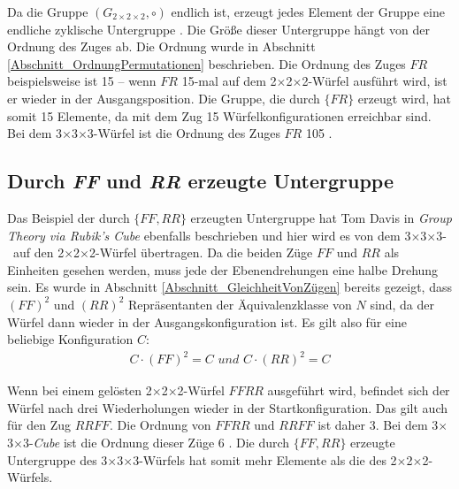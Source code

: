 \documentclass[12pt,a4paper, usenames, dvipsnames]{article}
\theoremstyle{mystyle}
\theoremstyle{definition}
\newcommand{\Gtwo}{\ensuremath{G_{2\times 2\times 2}}}
\newcommand{\Ttwo}{2$\times$2$\times$2-}
\newcommand{\Tthree}{3$\times$3$\times$3-}
\begin{document}
Da die Gruppe $(\Gtwo, \circ)$ endlich ist, erzeugt jedes Element der Gruppe eine endliche zyklische Untergruppe \cite{TD}. Die Größe dieser Untergruppe hängt von der Ordnung des Zuges ab. Die Ordnung wurde in Abschnitt \ref{Abschnitt_OrdnungPermutationen} beschrieben.
Die Ordnung des Zuges $FR$ beispielsweise ist 15 -- wenn $FR$ 15-mal auf dem \Ttwo Würfel ausführt wird, ist er wieder in der Ausgangsposition. 
Die Gruppe, die durch $\{FR\}$ erzeugt wird, hat somit 15 Elemente, da mit dem Zug 15 Würfelkonfigurationen erreichbar sind. Bei dem \Tthree Würfel ist die Ordnung des Zuges $FR$ 105 \cite{TD}.
%
%
%
%
%
%
%
%
%
%
%
%
%
%
%
%
%
%
%

\subsection{Durch \textit{FF} und \textit{RR} erzeugte Untergruppe}
\label{Abschnitt_UntergruppeFFRR}

Das Beispiel der durch $\{ FF, RR \}$ erzeugten Untergruppe hat Tom Davis in \textit{Group Theory via Rubik's Cube} \cite{TD} ebenfalls beschrieben und hier wird es von dem \Tthree \ auf den \Ttwo Würfel übertragen.
Da die beiden Züge $FF$ und $RR$ als Einheiten gesehen werden, muss jede der Ebenendrehungen eine halbe Drehung sein.
Es wurde in Abschnitt \ref{Abschnitt_GleichheitVonZügen} bereits gezeigt, dass $(FF)^2$ und $(RR)^2$ Repräsentanten der Äquivalenzklasse von $N$ sind, da der Würfel dann wieder in der Ausgangskonfiguration ist. Es gilt also für eine beliebige Konfiguration $C$:
\begin{align*}
C \cdot (FF)^2 = C \textit{ und } C \cdot (RR)^2 = C
\end{align*}

Wenn bei einem gelösten \Ttwo Würfel $FFRR$ ausgeführt wird, befindet sich der Würfel nach drei Wiederholungen wieder in der Startkonfiguration. Das gilt auch für den Zug $RRFF$. Die Ordnung von $FFRR$ und $RRFF$ ist daher 3. Bei dem \Tthree \textit{Cube} ist die Ordnung dieser Züge 6 \cite{TD}.
Die durch $\{ FF, RR \}$ erzeugte Untergruppe des \Tthree Würfels hat somit mehr Elemente als die des \Ttwo Würfels. 
\end{document}
